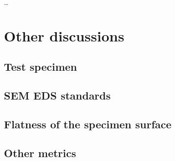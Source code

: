 
\dots










\section{Other discussions}
\label{discussion:other}

\subsection{Test specimen}
\label{discussion:other:test_specimen}

\subsection{SEM EDS standards}
\label{discussion:other:sem_eds_standards}

\subsection{Flatness of the specimen surface}
\label{discussion:other:flatness}

\subsection{Other metrics}
\label{discussion:other:other_metrics}




















